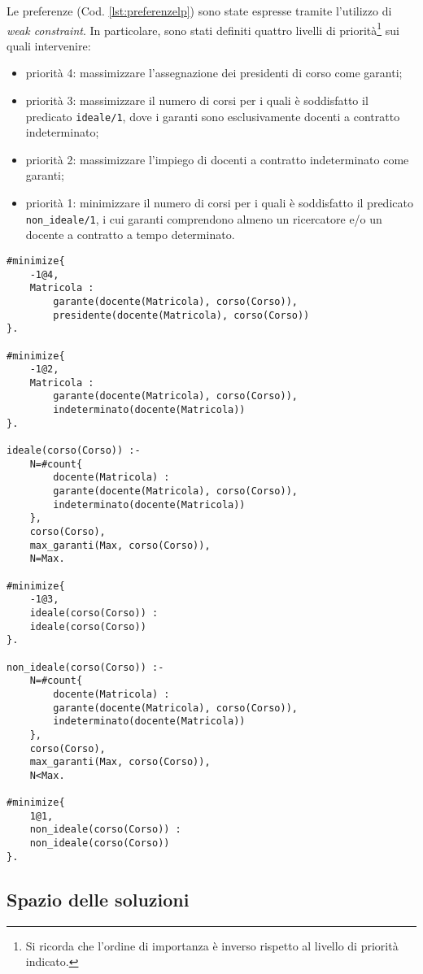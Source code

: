 \documentclass[journal]{IEEEtran}
\begin{document}
Le preferenze (Cod. \ref{lst:preferenzelp}) sono state espresse tramite l'utilizzo di \textit{weak constraint}. In particolare, sono stati definiti quattro livelli di priorità\footnote{Si ricorda che l'ordine di importanza è inverso rispetto al livello di priorità indicato.} sui quali intervenire:
\begin{itemize}
    \item priorità 4: massimizzare l'assegnazione dei presidenti di corso come garanti;
    \item priorità 3: massimizzare il numero di corsi per i quali è soddisfatto il predicato \texttt{ideale/1}, dove i garanti sono esclusivamente docenti a contratto indeterminato;
    \item priorità 2: massimizzare l'impiego di docenti a contratto indeterminato come garanti;
    \item priorità 1: minimizzare il numero di corsi per i quali è soddisfatto il predicato \texttt{non\_ideale/1}, i cui garanti comprendono almeno un ricercatore e/o un docente a contratto a tempo determinato.
\end{itemize}

\begin{lstlisting}[style=asp, caption={Codice ASP del file \texttt{preferenze.lp}.}, label={lst:preferenzelp}]
#minimize{
	-1@4,
	Matricola :
		garante(docente(Matricola), corso(Corso)),
		presidente(docente(Matricola), corso(Corso))
}.

#minimize{
	-1@2,
	Matricola :
		garante(docente(Matricola), corso(Corso)),
		indeterminato(docente(Matricola))
}.

ideale(corso(Corso)) :-
	N=#count{
		docente(Matricola) :
		garante(docente(Matricola), corso(Corso)),
		indeterminato(docente(Matricola))
	},
	corso(Corso),
	max_garanti(Max, corso(Corso)),
	N=Max.

#minimize{
	-1@3,
	ideale(corso(Corso)) :
	ideale(corso(Corso))
}.

non_ideale(corso(Corso)) :-
	N=#count{
		docente(Matricola) :
		garante(docente(Matricola), corso(Corso)),
		indeterminato(docente(Matricola))
	},
	corso(Corso),
	max_garanti(Max, corso(Corso)),
	N<Max.

#minimize{
	1@1,
	non_ideale(corso(Corso)) :
	non_ideale(corso(Corso))
}.
\end{lstlisting}


\subsection{Spazio delle soluzioni}
\end{document}
